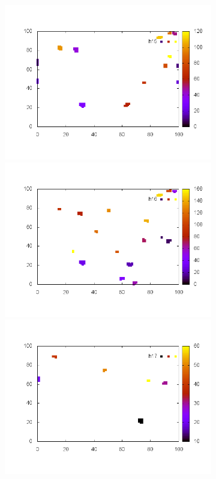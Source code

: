 \documentclass[10pt,a4paper]{article}
\begin{document}
\begin{figure}
\begin{subfigure}[b]{1\textwidth}
\includegraphics[scale=.3]{./img/SCC_Stable3/cut99p/15.png}
\includegraphics[scale=.3]{./img/SCC_Stable3/cut99p/16.png}
\includegraphics[scale=.3]{./img/SCC_Stable3/cut99p/17.png}
\end{subfigure}


\end{figure}
\end{document}

